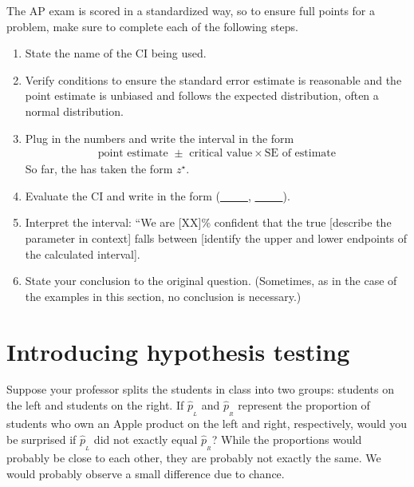 \begin{termBox}{
The AP exam is scored in a standardized way, so to ensure full points for a problem, make sure to complete each of the following steps.
\begin{enumerate}
\setlength{\itemsep}{0mm}
\item State the name of the CI being used.
\item Verify conditions to ensure the standard error estimate is reasonable and the point estimate is unbiased and follows the expected distribution, often a normal distribution.
\item Plug in the numbers and write the interval in the form\vspace{-1mm}
\begin{align*}
\text{point estimate } \pm \text{ critical value}\times \text{SE of estimate}
\end{align*}\vspace{-1mm}%
So far, the  has taken the form $z^\star$.
\item Evaluate the CI and write in the form (\underline{\ \ \ \ \ }, \underline{\ \ \ \ \ }).
\item Interpret the interval: ``We are [XX]\% confident that the true [describe the parameter in context] falls between [identify the upper and lower endpoints of the calculated interval].
\item State your conclusion to the original question. (Sometimes, as in the case of the examples in this section, no conclusion is necessary.)
\end{enumerate}}
\end{termBox}




\section{Introducing hypothesis testing}


\begin{example}{Suppose your professor splits the students in class into two groups: students on the left and students on the right. If $\hat{p}_{_L}$ and $\hat{p}_{_R}$ represent the proportion of students who own an Apple product on the left and right, respectively, would you be surprised if $\hat{p}_{_L}$ did not {exactly} equal $\hat{p}_{_R}$?}
While the proportions would probably be close to each other, they are probably not exactly the same. We would probably observe a small difference due to {chance}.
\end{example}

